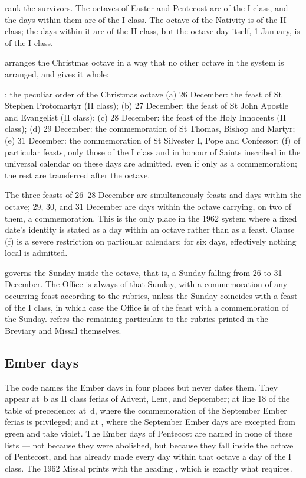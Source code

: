  rank the survivors. The octaves of Easter and Pentecost are of the I class, and
 — the days within them are of the I class. The
octave of the Nativity is of the II class; the days within it are of the II class, but the
octave day itself, 1 January, is of the I class.

 arranges the Christmas octave in a way that no other octave in the system is arranged,
and gives it whole:

\begin{studybox}{: the peculiar order of the Christmas octave}
(a) 26 December: the feast of St Stephen Protomartyr (II class);
(b) 27 December: the feast of St John Apostle and Evangelist (II class);
(c) 28 December: the feast of the Holy Innocents (II class);
(d) 29 December: the commemoration of St Thomas, Bishop and Martyr;
(e) 31 December: the commemoration of St Silvester I, Pope and Confessor;
(f) of particular feasts, only those of the I class and in honour of Saints inscribed in the
universal calendar on these days are admitted, even if only as a commemoration; the rest are
transferred after the octave.
\end{studybox}

The three feasts of 26--28 December are simultaneously feasts and days within the octave; 29, 30,
and 31 December are days within the octave carrying, on two of them, a commemoration. This is
the only place in the 1962 system where a fixed date's identity is stated as a day within an
octave rather than as a feast. Clause (f) is a severe restriction on particular calendars: for
six days, effectively nothing local is admitted.

 governs the Sunday inside the octave, that is, a Sunday falling from 26 to 31 December.
The Office is always of that Sunday, with a commemoration of any occurring feast according to
the rubrics, unless the Sunday coincides with a feast of the I class, in which case the Office is
of the feast with a commemoration of the Sunday.  refers the remaining particulars to the
rubrics printed in the Breviary and Missal themselves.

\subsection{Ember days}

The code names the Ember days in four places but never dates them. They appear at \,b as
II class ferias of Advent, Lent, and September; at line 18 of the table of precedence; at
\,d, where the commemoration of the September Ember ferias is privileged; and at
, where the September Ember days are excepted from green and take violet. The
Ember days of Pentecost are named in none of these lists — not because they were abolished, but
because they fall inside the octave of Pentecost, and  has already made every day within
that octave a day of the I class. The 1962 Missal prints  with the heading , which is exactly what  requires.

